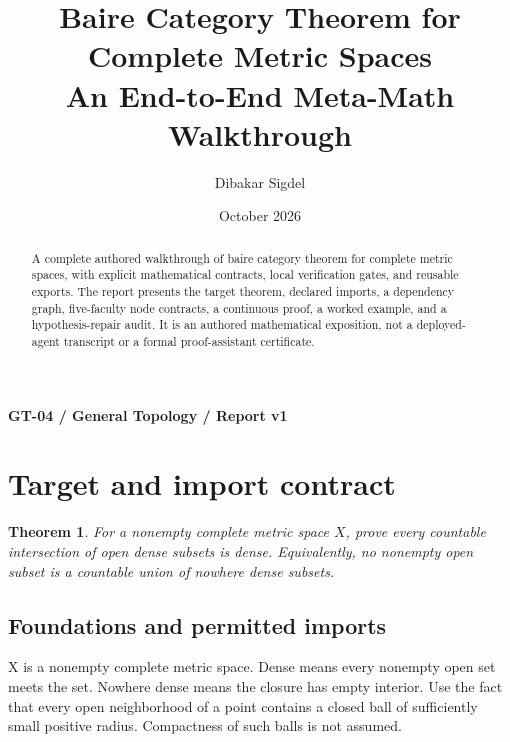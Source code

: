\documentclass[preprint,12pt,aps,pra,showkeys,amsmath,amssymb,superscriptaddress,floatfix]{revtex4-2}
\newtheorem{theorem}{Theorem}[section]
\theoremstyle{definition}
\theoremstyle{remark}
\begin{document}
\title{Baire Category Theorem for Complete Metric Spaces\\[4pt]\large An End-to-End Meta-Math Walkthrough}

\author{Dibakar Sigdel}


\date{October 2026}

\begin{abstract}

A complete authored walkthrough of baire category theorem for complete
metric spaces, with explicit mathematical contracts, local verification
gates, and reusable exports. The report presents the target theorem,
declared imports, a dependency graph, five-faculty node contracts, a
continuous proof, a worked example, and a hypothesis-repair audit. It is
an authored mathematical exposition, not a deployed-agent transcript or
a formal proof-assistant certificate.

\end{abstract}\maketitle\linespread{1.12}\selectfont

\noindent\textbf{GT-04 / General Topology / Report v1}

\section{Target and import contract}

\begin{theorem}

For a nonempty complete metric space \(X\), prove every countable
intersection of open dense subsets is dense. Equivalently, no nonempty
open subset is a countable union of nowhere dense subsets.

\end{theorem}

\subsection{Foundations and permitted imports}

X is a nonempty complete metric space. Dense means every nonempty open
set meets the set. Nowhere dense means the closure has empty interior.
Use the fact that every open neighborhood of a point contains a closed
ball of sufficiently small positive radius. Compactness of such balls is
not assumed.
\end{document}
